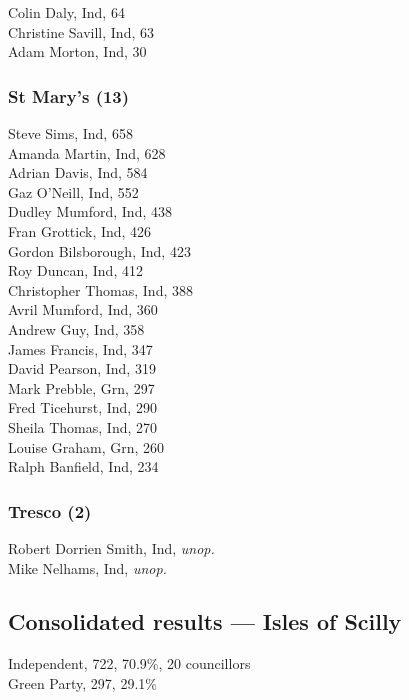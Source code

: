 \documentclass[a4paper,openany,10pt]{book}
\begin{document}
Colin Daly, Ind, 64\\
Christine Savill, Ind, 63\\
Adam Morton, Ind, 30\\


\subsubsection*{St Mary's (13)}



Steve Sims, Ind, 658\\
Amanda Martin, Ind, 628\\
Adrian Davis, Ind, 584\\
Gaz O'Neill, Ind, 552\\
Dudley Mumford, Ind, 438\\
Fran Grottick, Ind, 426\\
Gordon Bilsborough, Ind, 423\\
Roy Duncan, Ind, 412\\
Christopher Thomas, Ind, 388\\
Avril Mumford, Ind, 360\\
Andrew Guy, Ind, 358\\
James Francis, Ind, 347\\
David Pearson, Ind, 319\\
Mark Prebble, Grn, 297\\
Fred Ticehurst, Ind, 290\\
Sheila Thomas, Ind, 270\\
Louise Graham, Grn, 260\\
Ralph Banfield, Ind, 234\\


\subsubsection*{Tresco (2)}



Robert Dorrien Smith, Ind, \emph{unop.}\\
Mike Nelhams, Ind, \emph{unop.}\\


\subsection*{Consolidated results --- Isles of Scilly}
Independent, 722, 70.9\%, 20 councillors\\
Green Party, 297, 29.1\% \\
\end{document}
